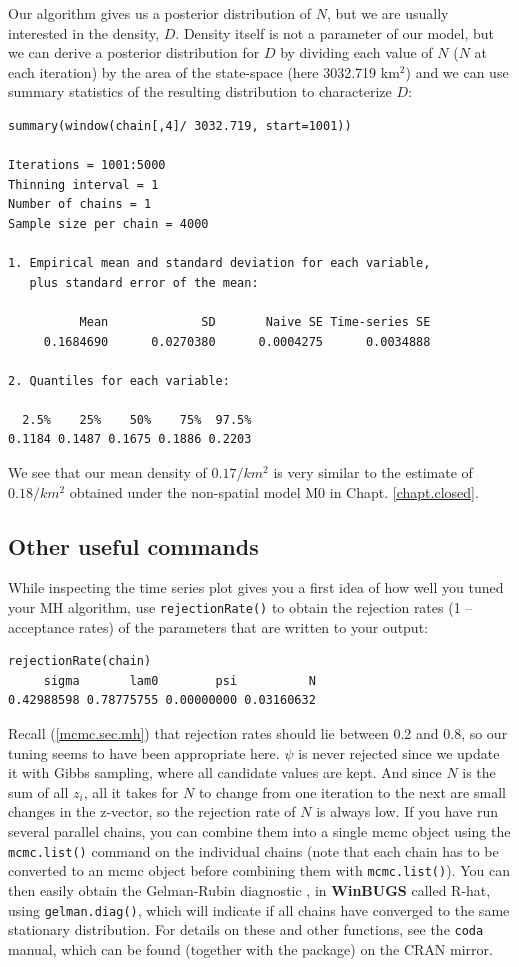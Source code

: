 Our algorithm gives us a posterior distribution of $N$, but we are usually 
interested in the density, $D$. Density itself is not a parameter of our 
model, but we can derive a posterior distribution for $D$ by dividing 
each value of $N$ ($N$ at each iteration) by the area of the state-space
 (here 3032.719 km$^2$) and we can use summary statistics of the 
 resulting distribution to characterize $D$:
\begin{verbatim}
summary(window(chain[,4]/ 3032.719, start=1001))

Iterations = 1001:5000
Thinning interval = 1 
Number of chains = 1 
Sample size per chain = 4000 

1. Empirical mean and standard deviation for each variable,
   plus standard error of the mean:

          Mean             SD       Naive SE Time-series SE 
     0.1684690      0.0270380      0.0004275      0.0034888 

2. Quantiles for each variable:

  2.5%    25%    50%    75%  97.5% 
0.1184 0.1487 0.1675 0.1886 0.2203 
\end{verbatim}
We see that our mean density of $0.17/km^2$ is very similar to the estimate of $0.18/km^2$ obtained under the non-spatial model M0 in Chapt. \ref{chapt.closed}.


\subsection{Other useful commands }
While inspecting the time series plot gives you a first idea of how well you tuned your MH algorithm, use \verb#rejectionRate()# to obtain the rejection rates (1 -- acceptance rates) of the parameters that are written to your output:
\begin{verbatim}
rejectionRate(chain)
     sigma       lam0        psi          N 
0.42988598 0.78775755 0.00000000 0.03160632 
\end{verbatim}
 Recall (\ref{mcmc.sec.mh}) that rejection rates should lie between 0.2 and 0.8, so our tuning seems to have been appropriate here. $\psi$ is never rejected since we update it with Gibbs sampling, where all candidate values are kept. And since $N$ is the sum of all $z_i$, all it takes for $N$ to change from one iteration to the next are small changes in the z-vector, so the rejection rate of $N$ is always low.
If you have run several parallel chains, you can combine them into a single mcmc object using the \verb#mcmc.list()# command on the individual chains (note that each chain has to be converted to an mcmc object before combining them with \verb#mcmc.list()#). You can then easily obtain the Gelman-Rubin diagnostic \citep{gelman_etal:2004}, in {\bf WinBUGS} called R-hat, using \verb#gelman.diag()#, which 
will indicate if all chains have converged to the same stationary distribution.
For details on these and other functions, see the \mbox{\tt coda} manual, 
which can be found (together with the package) on the CRAN mirror.

